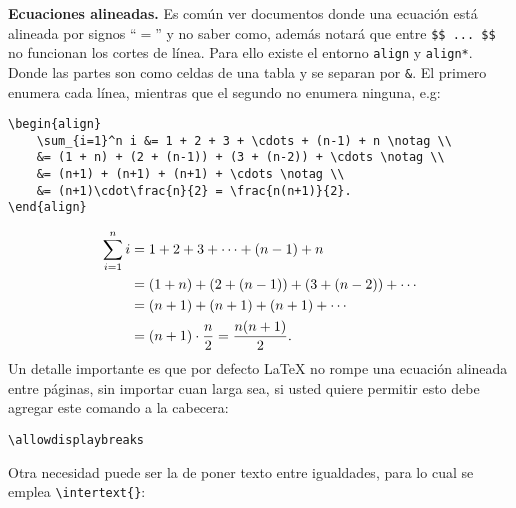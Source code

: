 \documentclass[intro-breve-latex.tex]{subfiles}
\begin{document}
\textbf{Ecuaciones alineadas.}
Es común ver documentos donde una ecuación está alineada por signos ``$=$'' y no saber como, además notará que entre
\lstinline|$$ ... $$| no funcionan los cortes de línea. Para ello existe el entorno \texttt{align} y \texttt{align*}.
Donde las partes son como celdas de una tabla y se separan por \texttt{\&}. El primero enumera cada línea, mientras que
el segundo no enumera ninguna, e.g:
\begin{lstlisting}[basicstyle=\footnotesize\ttfamily, tabsize=4]
\begin{align}
	\sum_{i=1}^n i &= 1 + 2 + 3 + \cdots + (n-1) + n \notag \\
	&= (1 + n) + (2 + (n-1)) + (3 + (n-2)) + \cdots \notag \\
	&= (n+1) + (n+1) + (n+1) + \cdots \notag \\
	&= (n+1)\cdot\frac{n}{2} = \frac{n(n+1)}{2}.
\end{align}
\end{lstlisting}
\begin{align}
	\sum_{i=1}^n i &= 1 + 2 + 3 + \cdots + (n-1) + n \notag \\
	&= (1 + n) + (2 + (n-1)) + (3 + (n-2)) + \cdots \notag \\
	&= (n+1) + (n+1) + (n+1) + \cdots \notag \\
	&= (n+1)\cdot\frac{n}{2} = \frac{n(n+1)}{2}.
\end{align}
Un detalle importante es que por defecto \LaTeX{} no rompe una ecuación alineada entre páginas, sin importar cuan larga
sea, si usted quiere permitir esto debe agregar este comando a la cabecera:
\begin{lstlisting}
\allowdisplaybreaks
\end{lstlisting}
Otra necesidad puede ser la de poner texto entre igualdades, para lo cual se emplea \lstinline|\intertext{}|:
\end{document}
